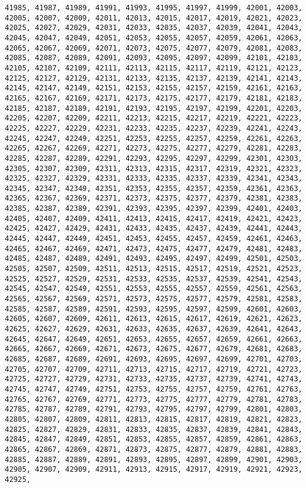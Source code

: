 \documentclass[11pt]{article}
\begin{document}
\begin{Verbatim}[commandchars=\\\{\}]
41985, 41987, 41989, 41991, 41993, 41995, 41997, 41999, 42001, 42003, 42005, 42007, 42009, 42011, 42013, 42015, 42017, 42019, 42021, 42023, 42025, 42027, 42029, 42031, 42033, 42035, 42037, 42039, 42041, 42043, 42045, 42047, 42049, 42051, 42053, 42055, 42057, 42059, 42061, 42063, 42065, 42067, 42069, 42071, 42073, 42075, 42077, 42079, 42081, 42083, 42085, 42087, 42089, 42091, 42093, 42095, 42097, 42099, 42101, 42103, 42105, 42107, 42109, 42111, 42113, 42115, 42117, 42119, 42121, 42123, 42125, 42127, 42129, 42131, 42133, 42135, 42137, 42139, 42141, 42143, 42145, 42147, 42149, 42151, 42153, 42155, 42157, 42159, 42161, 42163, 42165, 42167, 42169, 42171, 42173, 42175, 42177, 42179, 42181, 42183, 42185, 42187, 42189, 42191, 42193, 42195, 42197, 42199, 42201, 42203, 42205, 42207, 42209, 42211, 42213, 42215, 42217, 42219, 42221, 42223, 42225, 42227, 42229, 42231, 42233, 42235, 42237, 42239, 42241, 42243, 42245, 42247, 42249, 42251, 42253, 42255, 42257, 42259, 42261, 42263, 42265, 42267, 42269, 42271, 42273, 42275, 42277, 42279, 42281, 42283, 42285, 42287, 42289, 42291, 42293, 42295, 42297, 42299, 42301, 42303, 42305, 42307, 42309, 42311, 42313, 42315, 42317, 42319, 42321, 42323, 42325, 42327, 42329, 42331, 42333, 42335, 42337, 42339, 42341, 42343, 42345, 42347, 42349, 42351, 42353, 42355, 42357, 42359, 42361, 42363, 42365, 42367, 42369, 42371, 42373, 42375, 42377, 42379, 42381, 42383, 42385, 42387, 42389, 42391, 42393, 42395, 42397, 42399, 42401, 42403, 42405, 42407, 42409, 42411, 42413, 42415, 42417, 42419, 42421, 42423, 42425, 42427, 42429, 42431, 42433, 42435, 42437, 42439, 42441, 42443, 42445, 42447, 42449, 42451, 42453, 42455, 42457, 42459, 42461, 42463, 42465, 42467, 42469, 42471, 42473, 42475, 42477, 42479, 42481, 42483, 42485, 42487, 42489, 42491, 42493, 42495, 42497, 42499, 42501, 42503, 42505, 42507, 42509, 42511, 42513, 42515, 42517, 42519, 42521, 42523, 42525, 42527, 42529, 42531, 42533, 42535, 42537, 42539, 42541, 42543, 42545, 42547, 42549, 42551, 42553, 42555, 42557, 42559, 42561, 42563, 42565, 42567, 42569, 42571, 42573, 42575, 42577, 42579, 42581, 42583, 42585, 42587, 42589, 42591, 42593, 42595, 42597, 42599, 42601, 42603, 42605, 42607, 42609, 42611, 42613, 42615, 42617, 42619, 42621, 42623, 42625, 42627, 42629, 42631, 42633, 42635, 42637, 42639, 42641, 42643, 42645, 42647, 42649, 42651, 42653, 42655, 42657, 42659, 42661, 42663, 42665, 42667, 42669, 42671, 42673, 42675, 42677, 42679, 42681, 42683, 42685, 42687, 42689, 42691, 42693, 42695, 42697, 42699, 42701, 42703, 42705, 42707, 42709, 42711, 42713, 42715, 42717, 42719, 42721, 42723, 42725, 42727, 42729, 42731, 42733, 42735, 42737, 42739, 42741, 42743, 42745, 42747, 42749, 42751, 42753, 42755, 42757, 42759, 42761, 42763, 42765, 42767, 42769, 42771, 42773, 42775, 42777, 42779, 42781, 42783, 42785, 42787, 42789, 42791, 42793, 42795, 42797, 42799, 42801, 42803, 42805, 42807, 42809, 42811, 42813, 42815, 42817, 42819, 42821, 42823, 42825, 42827, 42829, 42831, 42833, 42835, 42837, 42839, 42841, 42843, 42845, 42847, 42849, 42851, 42853, 42855, 42857, 42859, 42861, 42863, 42865, 42867, 42869, 42871, 42873, 42875, 42877, 42879, 42881, 42883, 42885, 42887, 42889, 42891, 42893, 42895, 42897, 42899, 42901, 42903, 42905, 42907, 42909, 42911, 42913, 42915, 42917, 42919, 42921, 42923, 42925, 
\end{Verbatim}
\end{document}
